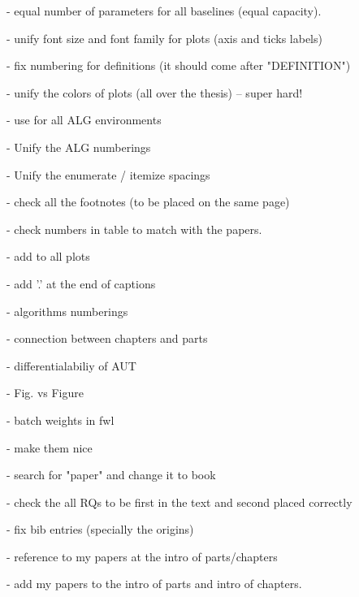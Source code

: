  - equal number of parameters for all baselines (equal capacity).

 - unify font size and font family for plots (axis and ticks labels)
 
 - fix numbering for definitions (it should come after "DEFINITION")
 
 - unify the colors of plots (all over the thesis) -- super hard!
 
 - use \small for all ALG environments
 
 - Unify the ALG numberings
 
 - Unify the enumerate / itemize spacings
 
 - check all the footnotes (to be placed on the same page)
 
 - check numbers in table to match with the papers.
 
 - add \selectfont to all plots
 
 - add '.' at the end of captions
 
 - algorithms numberings
 
 - connection between chapters and parts
 
 - differentialabiliy of AUT
 
 - Fig. vs Figure
 
 - batch weights in fwl
 
 - \url{} make them nice
 
 - search for "paper" and change it to book
 
 - check the all RQs to be first in the text and second placed correctly
 
 - fix bib entries (specially the origins)
 
 - reference to my papers at the intro of parts/chapters
 
 - add my papers to the intro of parts and intro of chapters.